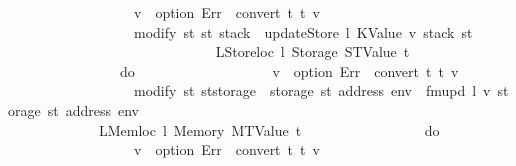 \begin{isabellebody}
\ \ \ \ \ \ \ \ \ \ \ \ \ \ \ \ \ \ v{\isacharprime}{\kern0pt}\ {\isasymleftarrow}\ option\ Err\ {\isacharparenleft}{\kern0pt}{\isasymlambda}{\isacharunderscore}{\kern0pt}{\isachardot}{\kern0pt}\ convert\ t\ t{\isacharprime}{\kern0pt}\ v{\isacharparenright}{\kern0pt}{\isacharsemicolon}{\kern0pt}\isanewline
\ \ \ \ \ \ \ \ \ \ \ \ \ \ \ \ \ \ modify\ {\isacharparenleft}{\kern0pt}{\isasymlambda}st{\isachardot}{\kern0pt}\ st\ {\isasymlparr}stack\ {\isacharcolon}{\kern0pt}{\isacharequal}{\kern0pt}\ updateStore\ l\ {\isacharparenleft}{\kern0pt}KValue\ v{\isacharprime}{\kern0pt}{\isacharparenright}{\kern0pt}\ {\isacharparenleft}{\kern0pt}stack\ st{\isacharparenright}{\kern0pt}{\isasymrparr}{\isacharparenright}{\kern0pt}\isanewline
\ \ \ \ \ \ \ \ \ \ \ \ \ \ \ \ {\isacharbraceright}{\kern0pt}\isanewline
\ \ \ \ \ \ \ \ \ \ \ \ {\isacharbar}{\kern0pt}\ {\isacharparenleft}{\kern0pt}LStoreloc\ l{\isacharcomma}{\kern0pt}\ Storage\ {\isacharparenleft}{\kern0pt}STValue\ t{\isacharprime}{\kern0pt}{\isacharparenright}{\kern0pt}{\isacharparenright}{\kern0pt}\ {\isasymRightarrow}\isanewline
\ \ \ \ \ \ \ \ \ \ \ \ \ \ \ \ do\ {\isacharbraceleft}{\kern0pt}\isanewline
\ \ \ \ \ \ \ \ \ \ \ \ \ \ \ \ \ \ v{\isacharprime}{\kern0pt}\ {\isasymleftarrow}\ option\ Err\ {\isacharparenleft}{\kern0pt}{\isasymlambda}{\isacharunderscore}{\kern0pt}{\isachardot}{\kern0pt}\ convert\ t\ t{\isacharprime}{\kern0pt}\ v{\isacharparenright}{\kern0pt}{\isacharsemicolon}{\kern0pt}\isanewline
\ \ \ \ \ \ \ \ \ \ \ \ \ \ \ \ \ \ modify\ {\isacharparenleft}{\kern0pt}{\isasymlambda}st{\isachardot}{\kern0pt}\ st{\isasymlparr}storage\ {\isacharcolon}{\kern0pt}{\isacharequal}{\kern0pt}\ {\isacharparenleft}{\kern0pt}storage\ st{\isacharparenright}{\kern0pt}\ {\isacharparenleft}{\kern0pt}address\ env\ {\isacharcolon}{\kern0pt}{\isacharequal}{\kern0pt}\ fmupd\ l\ v{\isacharprime}{\kern0pt}\ {\isacharparenleft}{\kern0pt}storage\ st\ {\isacharparenleft}{\kern0pt}address\ env{\isacharparenright}{\kern0pt}{\isacharparenright}{\kern0pt}{\isacharparenright}{\kern0pt}{\isasymrparr}{\isacharparenright}{\kern0pt}\isanewline
\ \ \ \ \ \ \ \ \ \ \ \ \ \ \ \ {\isacharbraceright}{\kern0pt}\isanewline
\ \ \ \ \ \ \ \ \ \ \ \ {\isacharbar}{\kern0pt}\ {\isacharparenleft}{\kern0pt}LMemloc\ l{\isacharcomma}{\kern0pt}\ Memory\ {\isacharparenleft}{\kern0pt}MTValue\ t{\isacharprime}{\kern0pt}{\isacharparenright}{\kern0pt}{\isacharparenright}{\kern0pt}\ {\isasymRightarrow}\isanewline
\ \ \ \ \ \ \ \ \ \ \ \ \ \ \ \ do\ {\isacharbraceleft}{\kern0pt}\isanewline
\ \ \ \ \ \ \ \ \ \ \ \ \ \ \ \ \ \ v{\isacharprime}{\kern0pt}\ {\isasymleftarrow}\ option\ Err\ {\isacharparenleft}{\kern0pt}{\isasymlambda}{\isacharunderscore}{\kern0pt}{\isachardot}{\kern0pt}\ convert\ t\ t{\isacharprime}{\kern0pt}\ v{\isacharparenright}{\kern0pt}{\isacharsemicolon}{\kern0pt}\isanewline

\end{isabellebody}
